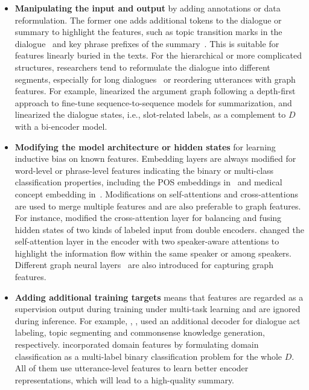 \begin{itemize}
\item \textbf{Manipulating the input and output} by adding annotations or data reformulation. The former one adds additional tokens to the dialogue or summary to highlight the features, such as topic transition marks in the dialogue~\cite{chen2020multi} and key phrase prefixes of the summary~\cite{wu2021controllable}. This is suitable for features linearly buried in the texts. For the hierarchical or more complicated structures, researchers tend to reformulate the dialogue into different segments, especially for long dialogues~\cite{zhong2021qmsum,banerjee2015generating,shang2018unsupervised} or reordering utterances with graph features. For example,  \citet{fabbri2021convosumm} linearized the argument graph following a depth-first approach to fine-tune sequence-to-sequence models for summarization, and \citet{zhao2021todsum} linearized the dialogue states, i.e., slot-related labels, as a complement to $D$ with a bi-encoder model.



\item \textbf{Modifying the model architecture or hidden states} for learning inductive bias on known features. Embedding layers are always modified for word-level or phrase-level features indicating the binary or multi-class classification properties, including the POS embeddings in~\cite{zhu2020end} and medical concept embedding in~\cite{joshi2020dr}. Modifications on self-attentions and cross-attentions are used to merge multiple features and are also preferable to graph features. For instance, \citet{chen2020multi} modified the cross-attention layer for balancing and fusing hidden states of two kinds of labeled input from double encoders. \citet{lei2021hierarchical} changed the self-attention layer in the encoder with two speaker-aware attentions to highlight the information flow within the same speaker or among speakers. Different graph neural layers~\cite{feng2021incorporating,liu2021coreference,chen2021structure} are also introduced for capturing graph features.


\item \textbf{Adding additional training targets} means that features are regarded as a supervision output during training under multi-task learning and are ignored during inference. For example, \citet{goo2018abstractive}, \citet{li2019keep}, \citet{kim2022mind} used an additional decoder for dialogue act labeling, topic segmenting and commonsense knowledge generation, respectively.
\citet{yuan2019scaffolds} incorporated domain features by formulating domain classification as a multi-label binary classification problem for the whole $D$. All of them use utterance-level features to learn better encoder representations, which will lead to a high-quality summary.

\end{itemize}

